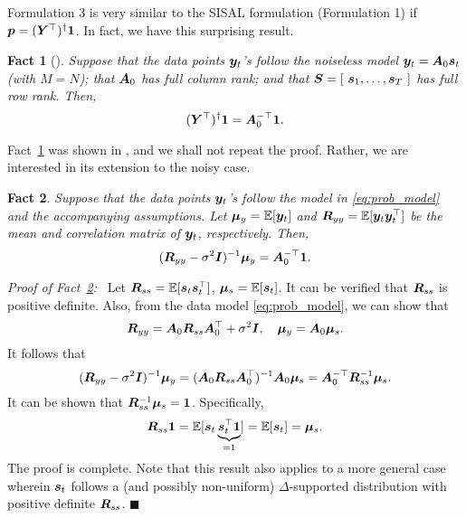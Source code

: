 \documentclass[10pt,twocolumn,twoside]{IEEEtran}
\newtheorem{Fact}{Fact}
\begin{document}
\medskip

Formulation 3 is very similar to the SISAL formulation (Formulation 1) if ${\bm p} = ({\bm Y}^\top)^\dag {\bm 1}$.
In fact, we have this surprising result.
\begin{Fact}[\cite{Ma2021}] \label{fact:con1}
	Suppose that the data points ${\bm y}_t$'s follow the noiseless model ${\bm y}_t  = {\bm A}_0 {\bm s}_t$ (with $M= N$); that ${\bm A}_0$ has full column rank; and that ${\bm S} = [~ {\bm s}_1,\ldots,{\bm s}_T ~]$ has full row rank. Then,
	\[
	({\bm Y}^\top)^\dag {\bm 1} = {\bm A}_0^{-\top} {\bm 1}.
	\]
\end{Fact}
Fact~\ref{fact:con1} was shown in \cite{Ma2021}, and we shall not repeat the proof.
Rather, we are interested in its extension to the noisy case.
\begin{Fact} \label{fact:con2}
	Suppose that the data points ${\bm y}_t$'s follow the model in \eqref{eq:prob_model} and the accompanying assumptions. Let ${\bm \mu}_y = \mathbb{E}[ {\bm y}_t ]$ and ${\bm R}_{yy} = \mathbb{E}[ {\bm y}_t {\bm y}_t^\top ]$ be the mean and correlation matrix of $ {\bm y}_t $, respectively. Then,
	\[
	( {\bm R}_{yy} - \sigma^2 {\bm I} )^{-1} {\bm \mu}_y = {\bm A}_0^{-\top} {\bm 1}.
	\]
\end{Fact}

{\em Proof of Fact~\ref{fact:con2}:} \
Let ${\bm R}_{ss} = \mathbb{E}[ {\bm s}_t {\bm s}_t^\top ]$, ${\bm \mu}_s  = \mathbb{E} [ {\bm s}_t ]$. It can be verified that ${\bm R}_{ss}$ is positive definite.
Also, from the data model \eqref{eq:prob_model}, we can show that
\[
{\bm R}_{yy} = {\bm A}_0 {\bm R}_{ss} {\bm A}_0^\top + \sigma^2 {\bm I},
\quad
{\bm \mu}_y = {\bm A}_0 {\bm \mu}_s.
\]
It follows that
\[
( {\bm R}_{yy} - \sigma^2 {\bm I} )^{-1} {\bm \mu}_y = ( {\bm A}_0 {\bm R}_{ss} {\bm A}_0^\top )^{-1} {\bm A}_0 {\bm \mu}_s
= {\bm A}_0^{-\top} {\bm R}_{ss}^{-1} {\bm \mu}_s.
\]
It can be shown that ${\bm R}_{ss}^{-1} {\bm \mu}_s = {\bm 1}$. Specifically,
\[
{\bm R}_{ss} {\bm 1} = \mathbb{E} [ {\bm s}_t \underbrace{{\bm s}_t^\top {\bm 1}}_{=1} ] =  \mathbb{E} [ {\bm s}_t ] = {\bm \mu}_s.
\]
The proof is complete.
Note that this result also applies to a more general case wherein ${\bm s}_t$ follows a (and possibly non-uniform) $\Delta$-supported distribution with positive definite ${\bm R}_{ss}$.
\hfill $\blacksquare$
\vspace{1em}
\end{document}
